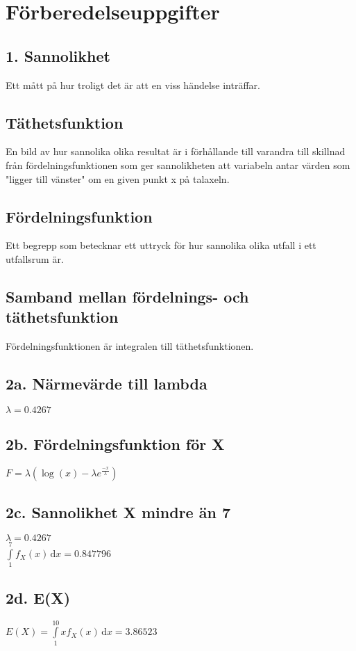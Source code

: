 \documentclass{article}
\begin{document}
\section*{Förberedelseuppgifter}

\subsection*{1. Sannolikhet}

Ett mått på hur troligt det är att en viss händelse inträffar.

\subsection*{Täthetsfunktion}

En bild av hur sannolika olika resultat är i förhållande till varandra till
skillnad från fördelningsfunktionen som ger sannolikheten att variabeln antar
värden som "ligger till vänster" om en given punkt x på talaxeln.

\subsection*{Fördelningsfunktion}

Ett begrepp som betecknar ett uttryck för hur sannolika olika utfall i ett
utfallsrum är.

\subsection*{Samband mellan fördelnings- och täthetsfunktion}

Fördelningsfunktionen är integralen till täthetsfunktionen.

\subsection*{2a. Närmevärde till lambda}
$\lambda = 0.4267$
\subsection*{2b. Fördelningsfunktion för X}
$F = \lambda(\log(x)-\lambda e^{\frac{-x}{\lambda}})$
\subsection*{2c. Sannolikhet X mindre än 7}
$\lambda = 0.4267$ \\
$\int \limits_1^{7} f_X(x)  \, \mathrm{d}x = 0.847796$
\subsection*{2d. E(X)}
$E(X) = \int \limits_1^{10} xf_X(x)  \, \mathrm{d}x = 3.86523$
\end{document}

